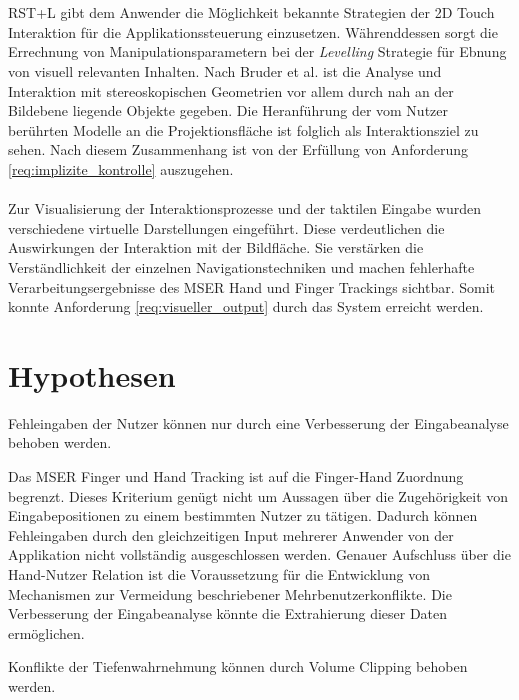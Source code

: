 \\\\
RST+L gibt dem Anwender die Möglichkeit bekannte Strategien der 2D Touch Interaktion für die Applikationssteuerung einzusetzen. Währenddessen sorgt die Errechnung von Manipulationsparametern bei der \emph{Levelling} Strategie für Ebnung von visuell relevanten Inhalten. Nach Bruder et al. ist die Analyse und Interaktion mit stereoskopischen Geometrien vor allem durch nah an der Bildebene liegende Objekte gegeben. Die Heranführung der vom Nutzer berührten Modelle an die Projektionsfläche ist folglich als Interaktionsziel zu sehen. Nach diesem Zusammenhang ist von der Erfüllung von Anforderung \ref{req:implizite_kontrolle} auszugehen.
\\\\
Zur Visualisierung der Interaktionsprozesse und der taktilen Eingabe wurden verschiedene virtuelle Darstellungen eingeführt. Diese verdeutlichen die Auswirkungen der Interaktion mit der Bildfläche. Sie  verstärken die Verständlichkeit der einzelnen Navigationstechniken und machen fehlerhafte Verarbeitungsergebnisse des MSER Hand und Finger Trackings sichtbar. Somit konnte Anforderung \ref{req:visueller_output} durch das System erreicht werden.


\section{Hypothesen}
\label{sec:hypothesen}

	\begin{hypothese}
	\label{hyp:fehleingaben}
		Fehleingaben der Nutzer können nur durch eine Verbesserung der Eingabeanalyse behoben werden.
	\end{hypothese}

Das MSER Finger und Hand Tracking ist auf die Finger-Hand Zuordnung begrenzt. Dieses Kriterium genügt nicht um Aussagen über die Zugehörigkeit von Eingabepositionen zu einem bestimmten Nutzer zu tätigen. Dadurch können Fehleingaben durch den gleichzeitigen Input mehrerer Anwender von der Applikation nicht vollständig ausgeschlossen werden. Genauer Aufschluss über die Hand-Nutzer Relation ist die Voraussetzung für die Entwicklung von Mechanismen zur Vermeidung beschriebener Mehrbenutzerkonflikte. Die Verbesserung der Eingabeanalyse könnte die Extrahierung dieser Daten ermöglichen.

	\begin{hypothese}
		\label{hyp:konflikte}
		Konflikte der Tiefenwahrnehmung können durch Volume Clipping behoben werden.
	\end{hypothese}
	
